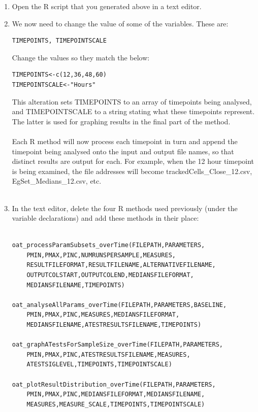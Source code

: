 \documentclass[a4paper,11pt]{article}
\begin{document}
\begin{enumerate}
\item Open the R script that you generated above in a text editor.
\item We now need to change the value of some of the variables.  These are:
\begin{verbatim}
TIMEPOINTS, TIMEPOINTSCALE
\end{verbatim}
Change the values so they match the below:
\begin{verbatim}
TIMEPOINTS<-c(12,36,48,60)
TIMEPOINTSCALE<-"Hours"
\end{verbatim}

This alteration sets TIMEPOINTS to an array of timepoints being analysed, and TIMEPOINTSCALE to a string stating what these timepoints represent. The latter is used for graphing results in the final part of the method.\\
\\
Each R method will now process each timepoint in turn and append the timepoint being analysed onto the input and output file names, so that distinct results are output for each.  For example, when the 12 hour timepoint is being examined, the file addresses will become trackedCells\_Close\_12.csv, EgSet\_Medians\_12.csv, etc.\\
\\

\item In the text editor, delete the four R methods used previously (under the variable declarations) and add these methods in their place:
\begin{verbatim}

oat_processParamSubsets_overTime(FILEPATH,PARAMETERS,
	PMIN,PMAX,PINC,NUMRUNSPERSAMPLE,MEASURES,
	RESULTFILEFORMAT,RESULTFILENAME,ALTERNATIVEFILENAME,
	OUTPUTCOLSTART,OUTPUTCOLEND,MEDIANSFILEFORMAT,
	MEDIANSFILENAME,TIMEPOINTS)

oat_analyseAllParams_overTime(FILEPATH,PARAMETERS,BASELINE,
	PMIN,PMAX,PINC,MEASURES,MEDIANSFILEFORMAT,
	MEDIANSFILENAME,ATESTRESULTSFILENAME,TIMEPOINTS)

oat_graphATestsForSampleSize_overTime(FILEPATH,PARAMETERS,
	PMIN,PMAX,PINC,ATESTRESULTSFILENAME,MEASURES,
	ATESTSIGLEVEL,TIMEPOINTS,TIMEPOINTSCALE)

oat_plotResultDistribution_overTime(FILEPATH,PARAMETERS,
	PMIN,PMAX,PINC,MEDIANSFILEFORMAT,MEDIANSFILENAME,
	MEASURES,MEASURE_SCALE,TIMEPOINTS,TIMEPOINTSCALE)

\end{verbatim}


\end{enumerate}
\end{document}
